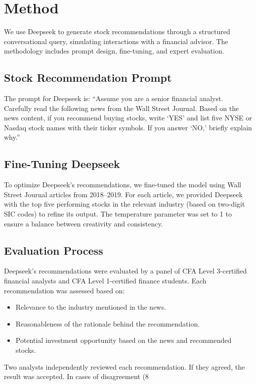 \documentclass{article}
\begin{document}
\section{Method}
We use Deepseek to generate stock recommendations through a structured conversational query, simulating interactions with a financial advisor. The methodology includes prompt design, fine-tuning, and expert evaluation.

\subsection{Stock Recommendation Prompt}
The prompt for Deepseek is:
``Assume you are a senior financial analyst. Carefully read the following news from the Wall Street Journal. Based on the news content, if you recommend buying stocks, write `YES’ and list five NYSE or Nasdaq stock names with their ticker symbols. If you answer `NO,’ briefly explain why.”

\subsection{Fine-Tuning Deepseek}
To optimize Deepseek’s recommendations, we fine-tuned the model using Wall Street Journal articles from 2018–2019. For each article, we provided Deepseek with the top five performing stocks in the relevant industry (based on two-digit SIC codes) to refine its output. The temperature parameter was set to 1 to ensure a balance between creativity and consistency.

\subsection{Evaluation Process}
Deepseek’s recommendations were evaluated by a panel of CFA Level 3-certified financial analysts and CFA Level 1-certified finance students. Each recommendation was assessed based on:
\begin{itemize}
    \item Relevance to the industry mentioned in the news.
    \item Reasonableness of the rationale behind the recommendation.
    \item Potential investment opportunity based on the news and recommended stocks.
\end{itemize}
Two analysts independently reviewed each recommendation. If they agreed, the result was accepted. In cases of disagreement (8%
\end{document}
